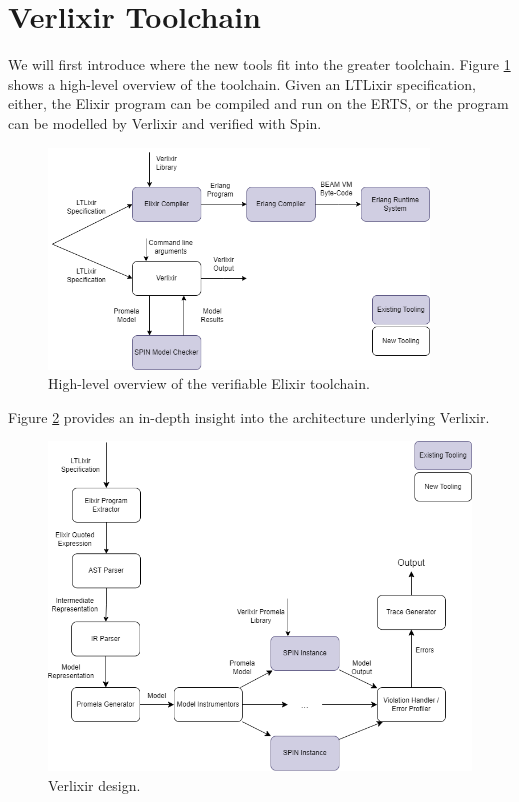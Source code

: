 \section{Verlixir Toolchain} \label{sec:toolchain}
We will first introduce where the new tools fit into the greater toolchain. Figure \ref{fig:high_level} shows a high-level overview of the toolchain. Given an LTLixir specification, either, the Elixir program can be compiled and run on the ERTS, or the program can be modelled by Verlixir and verified with Spin.
\begin{figure}[H]
    \centering
    \includegraphics[width=0.9\textwidth]{images/high_level_system_v2.drawio.png}
    \caption{High-level overview of the verifiable Elixir toolchain.}
    \label{fig:high_level}
\end{figure}
Figure \ref{fig:low_level} provides an in-depth insight into the architecture underlying Verlixir.
\begin{figure}[H]
    \centering
    \includegraphics[width=1\textwidth]{images/detailed_diagram_v2.drawio.png}
    \caption{Verlixir design.}
    \label{fig:low_level}
\end{figure}
